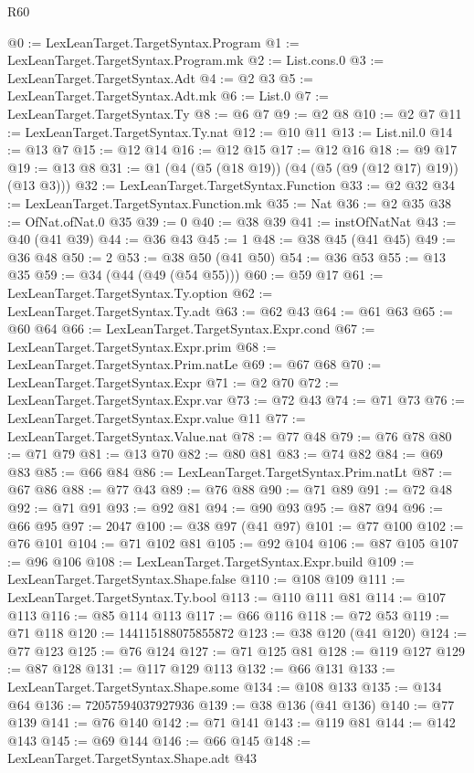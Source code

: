\begin{lexlean}{R60}
\begin{coremodule}
@0 := LexLeanTarget.TargetSyntax.Program
@1 := LexLeanTarget.TargetSyntax.Program.mk
@2 := List.cons.{0}
@3 := LexLeanTarget.TargetSyntax.Adt
@4 := @2 @3
@5 := LexLeanTarget.TargetSyntax.Adt.mk
@6 := List.{0}
@7 := LexLeanTarget.TargetSyntax.Ty
@8 := @6 @7
@9 := @2 @8
@10 := @2 @7
@11 := LexLeanTarget.TargetSyntax.Ty.nat
@12 := @10 @11
@13 := List.nil.{0}
@14 := @13 @7
@15 := @12 @14
@16 := @12 @15
@17 := @12 @16
@18 := @9 @17
@19 := @13 @8
@31 := @1 (@4 (@5 (@18 @19)) (@4 (@5 (@9 (@12 @17) @19)) (@13 @3)))
@32 := LexLeanTarget.TargetSyntax.Function
@33 := @2 @32
@34 := LexLeanTarget.TargetSyntax.Function.mk
@35 := Nat
@36 := @2 @35
@38 := OfNat.ofNat.{0} @35
@39 := 0
@40 := @38 @39
@41 := instOfNatNat
@43 := @40 (@41 @39)
@44 := @36 @43
@45 := 1
@48 := @38 @45 (@41 @45)
@49 := @36 @48
@50 := 2
@53 := @38 @50 (@41 @50)
@54 := @36 @53
@55 := @13 @35
@59 := @34 (@44 (@49 (@54 @55)))
@60 := @59 @17
@61 := LexLeanTarget.TargetSyntax.Ty.option
@62 := LexLeanTarget.TargetSyntax.Ty.adt
@63 := @62 @43
@64 := @61 @63
@65 := @60 @64
@66 := LexLeanTarget.TargetSyntax.Expr.cond
@67 := LexLeanTarget.TargetSyntax.Expr.prim
@68 := LexLeanTarget.TargetSyntax.Prim.natLe
@69 := @67 @68
@70 := LexLeanTarget.TargetSyntax.Expr
@71 := @2 @70
@72 := LexLeanTarget.TargetSyntax.Expr.var
@73 := @72 @43
@74 := @71 @73
@76 := LexLeanTarget.TargetSyntax.Expr.value @11
@77 := LexLeanTarget.TargetSyntax.Value.nat
@78 := @77 @48
@79 := @76 @78
@80 := @71 @79
@81 := @13 @70
@82 := @80 @81
@83 := @74 @82
@84 := @69 @83
@85 := @66 @84
@86 := LexLeanTarget.TargetSyntax.Prim.natLt
@87 := @67 @86
@88 := @77 @43
@89 := @76 @88
@90 := @71 @89
@91 := @72 @48
@92 := @71 @91
@93 := @92 @81
@94 := @90 @93
@95 := @87 @94
@96 := @66 @95
@97 := 2047
@100 := @38 @97 (@41 @97)
@101 := @77 @100
@102 := @76 @101
@104 := @71 @102 @81
@105 := @92 @104
@106 := @87 @105
@107 := @96 @106
@108 := LexLeanTarget.TargetSyntax.Expr.build
@109 := LexLeanTarget.TargetSyntax.Shape.false
@110 := @108 @109
@111 := LexLeanTarget.TargetSyntax.Ty.bool
@113 := @110 @111 @81
@114 := @107 @113
@116 := @85 @114 @113
@117 := @66 @116
@118 := @72 @53
@119 := @71 @118
@120 := 144115188075855872
@123 := @38 @120 (@41 @120)
@124 := @77 @123
@125 := @76 @124
@127 := @71 @125 @81
@128 := @119 @127
@129 := @87 @128
@131 := @117 @129 @113
@132 := @66 @131
@133 := LexLeanTarget.TargetSyntax.Shape.some
@134 := @108 @133
@135 := @134 @64
@136 := 72057594037927936
@139 := @38 @136 (@41 @136)
@140 := @77 @139
@141 := @76 @140
@142 := @71 @141
@143 := @119 @81
@144 := @142 @143
@145 := @69 @144
@146 := @66 @145
@148 := LexLeanTarget.TargetSyntax.Shape.adt @43

\end{coremodule}
\end{lexlean}
